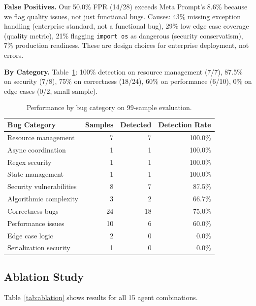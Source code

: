 \documentclass[10pt,twocolumn]{article}
\begin{document}
\textbf{False Positives.} Our 50.0\% FPR (14/28) exceeds Meta Prompt's 8.6\% because we flag quality issues, not just functional bugs. Causes: 43\% missing exception handling (enterprise standard, not a functional bug), 29\% low edge case coverage (quality metric), 21\% flagging \texttt{import os} as dangerous (security conservatism), 7\% production readiness. These are design choices for enterprise deployment, not errors.

\textbf{By Category.} Table~\ref{tab:category}: 100\% detection on resource management (7/7), 87.5\% on security (7/8), 75\% on correctness (18/24), 60\% on performance (6/10), 0\% on edge cases (0/2, small sample).

\begin{table}[t]
\centering
\caption{Performance by bug category on 99-sample evaluation.}
\label{tab:category}
\small
\begin{tabular}{@{}lrrr@{}}
\toprule
\textbf{Bug Category} & \textbf{Samples} & \textbf{Detected} & \textbf{Detection Rate} \\
\midrule
Resource management & 7 & 7 & 100.0\% \\
Async coordination & 1 & 1 & 100.0\% \\
Regex security & 1 & 1 & 100.0\% \\
State management & 1 & 1 & 100.0\% \\
\midrule
Security vulnerabilities & 8 & 7 & 87.5\% \\
Algorithmic complexity & 3 & 2 & 66.7\% \\
Correctness bugs & 24 & 18 & 75.0\% \\
Performance issues & 10 & 6 & 60.0\% \\
\midrule
Edge case logic & 2 & 0 & 0.0\% \\
Serialization security & 1 & 0 & 0.0\% \\
\bottomrule
\end{tabular}
\end{table}

\subsection{Ablation Study}

Table~\ref{tab:ablation} shows results for all 15 agent combinations.
\end{document}
